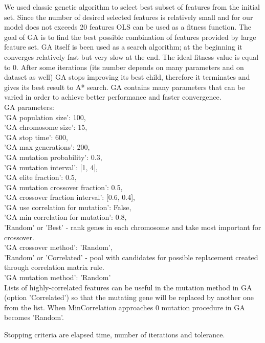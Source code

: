 \documentclass[aps,prl,reprint,amsmath,amssymb,nature]{revtex4-1}
\begin{document}
We used classic genetic algorithm to select best subset of features from the initial set. Since the number of desired selected features is relatively small and for our model does not exceeds 20 features OLS can be used as a fitness function. The goal of GA is to find the best possible combination of features provided by large feature set. GA itself is been used as a search algorithm; at the beginning it converges relatively fast but very slow at the end. The ideal fitness value is equal to 0. After some iterations (its number depends on many parameters and on dataset as well) GA stops improving its best child, therefore it terminates and gives its best result to A* search. GA contains many parameters that can be varied in order to achieve better performance and faster convergence.\\ 
GA parameters:\\
'GA population size': 100,\\
'GA chromosome size': 15,\\
'GA stop time': 600,\\
'GA max generations': 200,\\
'GA mutation probability': 0.3,\\
'GA mutation interval': [1, 4],\\
'GA elite fraction': 0.5,\\
'GA mutation crossover fraction': 0.5,\\
'GA crossover fraction interval': [0.6, 0.4],\\
'GA use correlation for mutation': False,\\
'GA min correlation for mutation': 0.8,\\
'Random' or 'Best' - rank genes in each chromosome and take most important for crossover.\\
'GA crossover method': 'Random',\\
'Random' or 'Correlated' - pool with candidates for possible replacement created through correlation matrix rule.\\
'GA mutation method': 'Random'\\
            
Lists of highly-correlated features can be useful in the mutation method in GA (option 'Correlated') so that the mutating gene will be replaced by another one from the list. When MinCorrelation approaches 0 mutation procedure in GA becomes 'Random'.
            
Stopping criteria are elapsed time, number of iterations and tolerance. 
\end{document}

